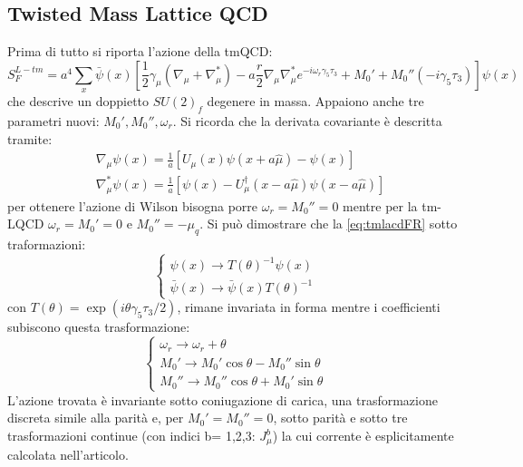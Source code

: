 \documentclass[12pt,a4paper,openright]{article}
\begin{document}
\subsection{Twisted Mass Lattice QCD}
Prima di tutto si riporta l'azione della tmQCD:
\begin{equation}\label{eq:tmlacdFR}
  S_F^{L-tm} = a^4 \sum_{x} \bar \psi (x) \left[ \frac{1}{2} \gamma_\mu \left(\nabla_\mu + \nabla_\mu^*\right) - a \frac{r}{2} \nabla_\mu \nabla_\mu^*e^{-i\omega_r \gamma_5 \tau_3} + M_0' + M_0''(-i\gamma_5 \tau_3)\right] \psi (x)
\end{equation}
che descrive un doppietto $SU(2)_f$ degenere in massa. Appaiono anche tre parametri nuovi: $M_0', M_0'', \omega_r$.
Si ricorda che la derivata covariante è descritta tramite:
\begin{equation*}
  \begin{aligned}
    & \nabla_\mu \psi (x) = \frac{1}{a} [ U_\mu (x) \psi (x + a \hat\mu) - \psi (x)] \\
    & \nabla_\mu^* \psi (x) = \frac{1}{a} [ \psi (x) - U_\mu^\dagger (x-a \hat\mu) \psi (x - a \hat\mu)]
  \end{aligned}
\end{equation*}
per ottenere l'azione di Wilson bisogna porre $\omega_r = M_0'' = 0$ mentre per la tm-LQCD $\omega_r = M_0' = 0$ e $M_0'' = -\mu_q$.
Si può dimostrare che la \ref{eq:tmlacdFR} sotto traformazioni:
\begin{equation*}
  \begin{cases}
    \psi (x) \rightarrow T(\theta)^{-1}\psi (x) \\
    \bar \psi (x) \rightarrow \bar \psi (x)T(\theta)^{-1}
  \end{cases}
\end{equation*}
con $T(\theta) = \exp\left(i \theta \gamma_5 \tau_3 /2 \right)$, rimane invariata in forma mentre i coefficienti subiscono questa trasformazione:
\begin{equation*}
  \begin{cases}
    \omega_r \rightarrow \omega_r +  \theta \\
    M_0' \rightarrow M_0'\cos \theta - M_0 ''\sin\theta \\
    M_0'' \rightarrow M_0''\cos \theta + M_0 '\sin\theta
  \end{cases}
\end{equation*}
L'azione trovata è invariante sotto coniugazione di carica, una trasformazione discreta simile alla parità e, per $M_0' = M_0'' = 0$, sotto parità e sotto tre trasformazioni continue (con indici b= 1,2,3: $J_\mu^{b}$) la cui corrente è esplicitamente calcolata nell'articolo.
\end{document}
